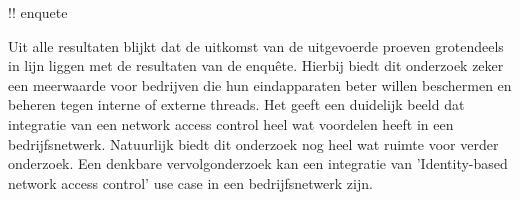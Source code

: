 !! enquete 


Uit alle resultaten blijkt dat de uitkomst van de uitgevoerde proeven grotendeels in lijn liggen met de resultaten van de enquête. Hierbij biedt dit onderzoek zeker een meerwaarde voor bedrijven die hun eindapparaten beter willen beschermen en beheren tegen interne of externe threads. Het geeft een duidelijk beeld dat integratie van een network access control heel wat voordelen heeft in een bedrijfsnetwerk. Natuurlijk biedt dit onderzoek nog heel wat ruimte voor verder onderzoek. Een denkbare vervolgonderzoek kan een integratie van 'Identity-based network access control' use case in een bedrijfsnetwerk zijn.
